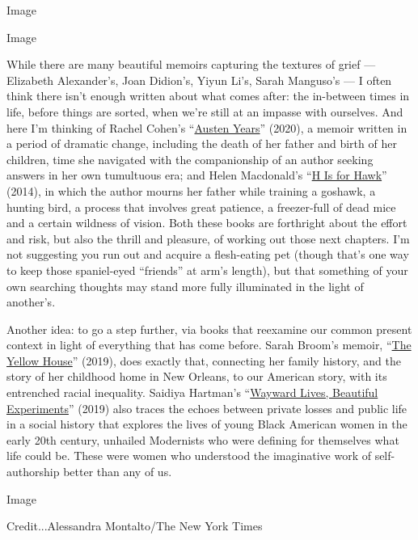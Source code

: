 Image

Image

While there are many beautiful memoirs capturing the textures of grief
--- Elizabeth Alexander's, Joan Didion's, Yiyun Li's, Sarah Manguso's
--- I often think there isn't enough written about what comes after: the
in-between times in life, before things are sorted, when we're still at
an impasse with ourselves. And here I'm thinking of Rachel Cohen's
``\href{https://www.nytimes.com/2020/07/21/books/review/austen-years-rachel-cohen.html}{Austen
Years}'' (2020), a memoir written in a period of dramatic change,
including the death of her father and birth of her children, time she
navigated with the companionship of an author seeking answers in her own
tumultuous era; and Helen Macdonald's
``\href{https://www.nytimes.com/2015/02/22/books/review/helen-macdonalds-h-is-for-hawk.html}{H
Is for Hawk}'' (2014), in which the author mourns her father while
training a goshawk, a hunting bird, a process that involves great
patience, a freezer-full of dead mice and a certain wildness of vision.
Both these books are forthright about the effort and risk, but also the
thrill and pleasure, of working out those next chapters. I'm not
suggesting you run out and acquire a flesh-eating pet (though that's one
way to keep those spaniel-eyed ``friends'' at arm's length), but that
something of your own searching thoughts may stand more fully
illuminated in the light of another's.

Another idea: to go a step further, via books that reexamine our common
present context in light of everything that has come before. Sarah
Broom's memoir,
``\href{https://www.nytimes.com/2019/08/05/books/review-yellow-house-sarah-broom.html}{The
Yellow House}'' (2019), does exactly that, connecting her family
history, and the story of her childhood home in New Orleans, to our
American story, with its entrenched racial inequality. Saidiya Hartman's
``\href{https://www.nytimes.com/2019/02/19/books/wayward-lives-beautiful-experiments-saidiya-hartman.html}{Wayward
Lives, Beautiful Experiments}'' (2019) also traces the echoes between
private losses and public life in a social history that explores the
lives of young Black American women in the early 20th century, unhailed
Modernists who were defining for themselves what life could be. These
were women who understood the imaginative work of self-authorship better
than any of us.

Image

Credit...Alessandra Montalto/The New York Times

